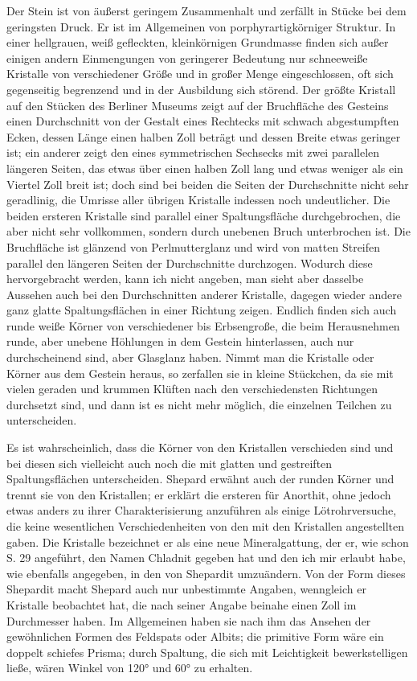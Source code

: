 \documentclass[a4paper, 11pt, oneside]{article}
\begin{document}
Der Stein ist von äußerst geringem Zusammenhalt und zerfällt in Stücke bei dem geringsten Druck. Er ist im Allgemeinen von porphyrartigkörniger Struktur. In einer hellgrauen, weiß gefleckten, kleinkörnigen Grundmasse finden sich außer einigen andern Einmengungen von geringerer Bedeutung nur schneeweiße Kristalle von verschiedener Größe und in großer Menge eingeschlossen, oft sich gegenseitig begrenzend und in der Ausbildung sich störend. Der größte Kristall auf den Stücken des Berliner Museums zeigt auf der Bruchfläche des Gesteins einen Durchschnitt von der Gestalt eines Rechtecks mit schwach abgestumpften Ecken, dessen Länge einen halben Zoll beträgt und dessen Breite etwas geringer ist; ein anderer zeigt den eines symmetrischen Sechsecks mit zwei parallelen längeren Seiten, das etwas über einen halben Zoll lang und etwas weniger als ein Viertel Zoll breit ist; doch sind bei beiden die Seiten der Durchschnitte nicht sehr geradlinig, die Umrisse aller übrigen Kristalle indessen noch undeutlicher. Die beiden ersteren Kristalle sind parallel einer Spaltungsfläche durchgebrochen, die aber nicht sehr vollkommen, sondern durch unebenen Bruch unterbrochen ist. Die Bruchfläche ist glänzend von Perlmutterglanz und wird von matten Streifen parallel den längeren Seiten der Durchschnitte durchzogen. Wodurch diese hervorgebracht werden, kann ich nicht angeben, man sieht aber dasselbe Aussehen auch bei den Durchschnitten anderer Kristalle, dagegen wieder andere ganz glatte Spaltungsflächen in einer Richtung zeigen. Endlich finden sich auch runde weiße Körner von verschiedener bis Erbsengroße, die beim Herausnehmen runde, aber unebene Höhlungen in dem Gestein hinterlassen, auch nur durchscheinend sind, aber Glasglanz haben. Nimmt man die Kristalle oder Körner aus dem Gestein heraus, so zerfallen sie in kleine Stückchen, da sie mit vielen geraden und krummen Klüften nach den verschiedensten Richtungen durchsetzt sind, und dann ist es nicht mehr möglich, die einzelnen Teilchen zu unterscheiden.

Es ist wahrscheinlich, dass die Körner von den Kristallen verschieden sind und bei diesen sich vielleicht auch noch die mit glatten und gestreiften Spaltungsflächen unterscheiden. Shepard erwähnt auch der runden Körner und trennt sie von den Kristallen; er erklärt die ersteren für Anorthit, ohne jedoch etwas anders zu ihrer Charakterisierung anzuführen als einige Lötrohrversuche, die keine wesentlichen Verschiedenheiten von den mit den Kristallen angestellten gaben. Die Kristalle bezeichnet er als eine neue Mineralgattung, der er, wie schon S. 29 angeführt, den Namen Chladnit gegeben hat und den ich mir erlaubt habe, wie ebenfalls angegeben, in den von Shepardit umzuändern. Von der Form dieses Shepardit macht Shepard auch nur unbestimmte Angaben, wenngleich er Kristalle beobachtet hat, die nach seiner Angabe beinahe einen Zoll im Durchmesser haben. Im Allgemeinen haben sie nach ihm das Ansehen der gewöhnlichen Formen des Feldspats oder Albits; die primitive Form wäre ein doppelt schiefes Prisma; durch Spaltung, die sich mit Leichtigkeit bewerkstelligen ließe, wären Winkel von 120° und 60° zu erhalten.
\end{document}
